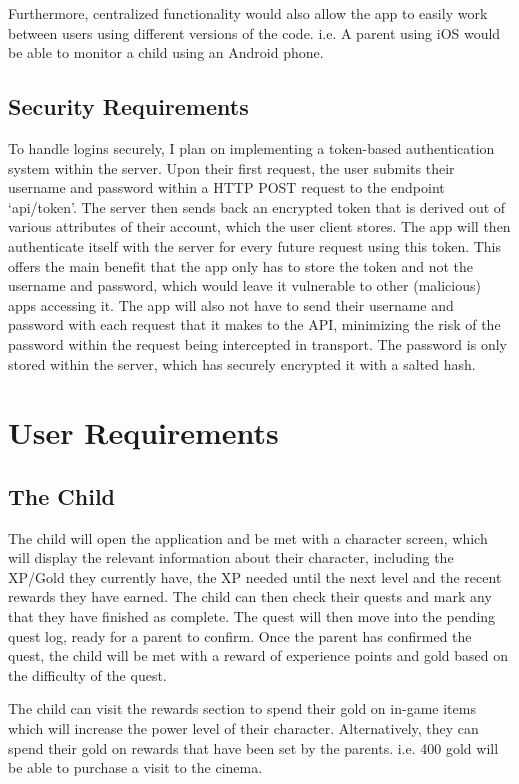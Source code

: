 Furthermore, centralized functionality would also allow the app to easily work between users using different versions of the code. 
i.e. A parent using iOS would be able to monitor a child using an Android phone.

\subsection{Security Requirements}
To handle logins securely, I plan on implementing a token-based authentication system within the server. 
Upon their first request, the user submits their username and password within a HTTP POST request to the endpoint `api/token'.
The server then sends back an encrypted token that is derived out of various attributes of their account, which the user client stores.
The app will then authenticate itself with the server for every future request using this token.
This offers the main benefit that the app only has to store the token and not the username and password, which would leave it vulnerable to other (malicious) apps accessing it.
The app will also not have to send their username and password with each request that it makes to the API, minimizing the risk of the password within the request being intercepted in transport.
The password is only stored within the server, which has securely encrypted it with a salted hash.



\section{User Requirements}
\subsection{The Child}
The child will open the application and be met with a character screen, which will display the relevant information about their character, including the XP/Gold they currently have, the XP needed until the next level and the recent rewards they have earned.
The child can then check their quests and mark any that they have finished as complete.
The quest will then move into the pending quest log, ready for a parent to confirm.
Once the parent has confirmed the quest, the child will be met with a reward of experience points and gold based on the difficulty of the quest.

The child can visit the rewards section to spend their gold on in-game items which will increase the power level of their character. 
Alternatively, they can spend their gold on rewards that have been set by the parents. 
i.e. 400 gold will be able to purchase a visit to the cinema.

